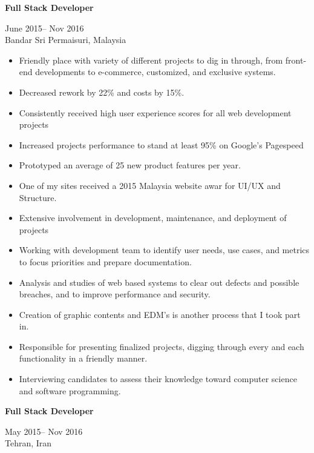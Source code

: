 \documentclass[10pt,a4paper,ragged2e,withhyper]{altacv}
\renewcommand{\cvevent}[4]{%
  \textbf{#1} %
  \hfill %
  \begin{minipage}[t]{.5\linewidth}
    \raggedleft %
    \small#3 %
    \\ %
    #4 %
  \end{minipage}
  \vspace{\baselineskip} %
}
\begin{document}
\divider

\vspace{0.5cm}

\cvevent{Full Stack Developer}{Cake Creative Digital Lab}{June 2015-- Nov 2016}{Bandar Sri Permaisuri, Malaysia}

\begin{itemize}

  \item   Friendly place with variety of different projects to dig in through, from front-end developments to e-commerce, customized, and exclusive systems.
  \item Decreased rework by 22\% and costs by 15\%. 
  \item Consistently received high user experience scores for all web development projects
  \item Increased projects performance to stand at least 95\% on Google’s Pagespeed
  \item Prototyped an average of 25 new product features per year.
  \item One of my sites received a 2015 Malaysia website awar for UI/UX and Structure. 
  \item Extensive involvement in development, maintenance, and deployment of projects
  \item Working with development team to identify user needs, use cases, and metrics to focus priorities and prepare documentation.
  \item Analysis and studies of web based systems to clear out defects and possible breaches, and to improve performance and security.
  \item Creation of graphic contents and EDM's is another process that I took part in.
  \item Responsible for presenting finalized projects, digging through every and each functionality in a friendly manner.
  \item Interviewing candidates to assess their knowledge toward computer science and software programming.
\end{itemize}

\divider

\vspace{0.5cm}

\cvevent{Full Stack Developer }{Cake Creative Digital Lab}{May 2015-- Nov 2016}{Tehran, Iran}
\end{document}
